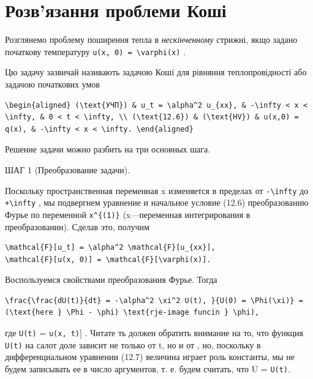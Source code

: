\documentclass[
  ukrainian,
]{article}
\begin{document}
\section{Розв'язання проблеми
Коші}\label{ux440ux43eux437ux432ux44fux437ux430ux43dux43dux44f-ux43fux440ux43eux431ux43bux435ux43cux438-ux43aux43eux448ux456}

Розглянемо проблему поширення тепла в \emph{нескінченному} стрижні, якщо
задано початкову температуру
\texttt{u(x,\ 0)\ =\ \textbackslash{}varphi(x)} .

Цю задачу зазвичай називають задачою Коші для рівняння теплопровідності
або задачою початкових умов

\begin{verbatim}
\begin{aligned} (\text{УЧП}) & u_t = \alpha^2 u_{xx}, & -\infty < x < \infty, & 0 < t < \infty, \\ (\text{12.6}) & (\text{HV}) & u(x,0) = q(x), & -\infty < x < \infty. \end{aligned}
\end{verbatim}

Решение задачи можно разбить на три основных шага.

ШАГ 1 (Преобразование задачи).

Поскольку пространственная переменная x изменяется в пределах от
\texttt{-\textbackslash{}infty} до \texttt{+\textbackslash{}infty} , мы
подвергнем уравнение и начальное условие (12.6) преобразованию Фурье по
переменной \texttt{x\^{}\{(1)\}} (x---переменная интегрирования в
преобразовании). Сделав это, получим

\begin{verbatim}
\mathcal{F}[u_t] = \alpha^2 \mathcal{F}[u_{xx}],
\mathcal{F}[u(x, 0)] = \mathcal{F}[\varphi(x)].
\end{verbatim}

Воспользуемся свойствами преобразования Фурье. Тогда

\begin{verbatim}
\frac{\frac{dU(t)}{dt} = -\alpha^2 \xi^2 U(t), }{U(0) = \Phi(\xi)} = (\text{here } \Phi - \phi) \text{rje-image funcin } \phi),
\end{verbatim}

где \texttt{U(t)} = \mathcal{F}{[}\texttt{u(x,\ t)}{]} . Читате ть
должен обратить внимание на то, что функция \texttt{U(t)} на салот доле
зависит не только от t, но и от \xi , но, поскольку в дифференциальном
уравнении (12.7) величина \xi  играет роль константы, мы не будем
записывать ее в число аргументов, т. е. будем считать, что U =
\texttt{U(t)}.
\end{document}
